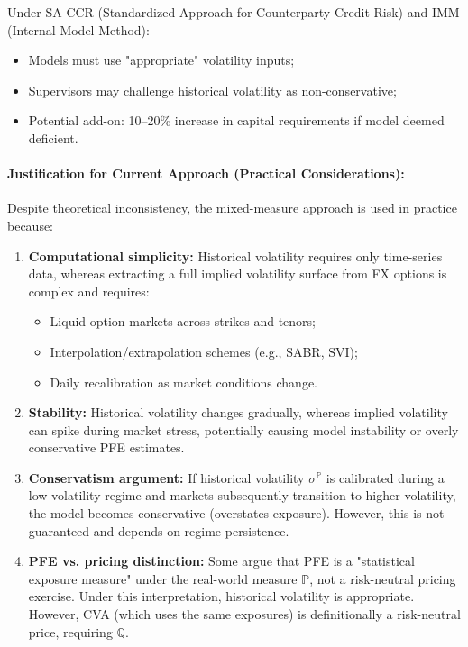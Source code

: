Under SA-CCR (Standardized Approach for Counterparty Credit Risk) and IMM (Internal Model Method):
\begin{itemize}
	\item Models must use "appropriate" volatility inputs;
	\item Supervisors may challenge historical volatility as non-conservative;
	\item Potential add-on: 10--20\% increase in capital requirements if model deemed deficient.
\end{itemize}

\paragraph{Justification for Current Approach (Practical Considerations):}

Despite theoretical inconsistency, the mixed-measure approach is used in practice because:

\begin{enumerate}
	\item \textbf{Computational simplicity:} Historical volatility requires only time-series data, whereas extracting a full implied volatility surface from FX options is complex and requires:
	\begin{itemize}
		\item Liquid option markets across strikes and tenors;
		\item Interpolation/extrapolation schemes (e.g., SABR, SVI);
		\item Daily recalibration as market conditions change.
	\end{itemize}
	
	\item \textbf{Stability:} Historical volatility changes gradually, whereas implied volatility can spike during market stress, potentially causing model instability or overly conservative PFE estimates.
	
	\item \textbf{Conservatism argument:} If historical volatility $\sigma^{\mathbb{P}}$ is calibrated during a low-volatility regime and markets subsequently transition to higher volatility, the model becomes conservative (overstates exposure). However, this is not guaranteed and depends on regime persistence.
	
	\item \textbf{PFE vs. pricing distinction:} Some argue that PFE is a "statistical exposure measure" under the real-world measure $\mathbb{P}$, not a risk-neutral pricing exercise. Under this interpretation, historical volatility is appropriate. However, CVA (which uses the same exposures) is definitionally a risk-neutral price, requiring $\mathbb{Q}$.
\end{enumerate}

